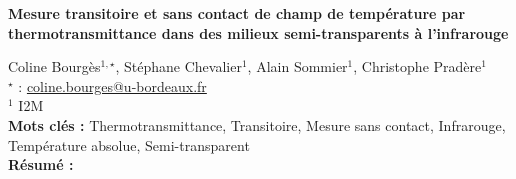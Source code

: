 


    \newpage


%
\begin{flushleft}
\addtocounter{section}{1}
{\Large \textbf{Mesure transitoire et sans contact de champ de température par thermotransmittance dans des milieux semi-transparents à l'infrarouge}}\label{ref:53}
\end{flushleft}
%
Coline Bourgès$^{1,\star}$, Stéphane Chevalier$^{1}$, Alain Sommier$^{1}$, Christophe Pradère$^{1}$\\[2mm]
$^{\star}$ \Letter : \url{coline.bourges@u-bordeaux.fr}\\[2mm]
{\footnotesize $^{1}$ I2M}\\
[4mm]
%
\noindent \textbf{Mots clés : } Thermotransmittance, Transitoire, Mesure sans contact, Infrarouge, Température absolue, Semi-transparent\\[4mm]
%
\noindent \textbf{Résumé : } 

